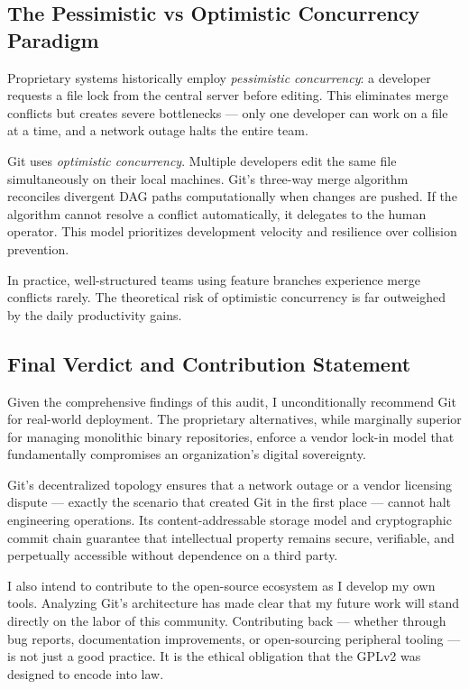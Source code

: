 \subsection{The Pessimistic vs Optimistic Concurrency Paradigm}

Proprietary systems historically employ \emph{pessimistic concurrency}: a developer
requests a file lock from the central server before editing. This eliminates merge
conflicts but creates severe bottlenecks — only one developer can work on a file at a
time, and a network outage halts the entire team.

Git uses \emph{optimistic concurrency}. Multiple developers edit the same file
simultaneously on their local machines. Git's three-way merge algorithm reconciles
divergent DAG paths computationally when changes are pushed. If the algorithm cannot
resolve a conflict automatically, it delegates to the human operator. This model
prioritizes development velocity and resilience over collision prevention.

In practice, well-structured teams using feature branches experience merge conflicts
rarely. The theoretical risk of optimistic concurrency is far outweighed by the daily
productivity gains.

\subsection{Final Verdict and Contribution Statement}

Given the comprehensive findings of this audit, I unconditionally recommend Git for
real-world deployment. The proprietary alternatives, while marginally superior for
managing monolithic binary repositories, enforce a vendor lock-in model that
fundamentally compromises an organization's digital sovereignty.

Git's decentralized topology ensures that a network outage or a vendor licensing
dispute — exactly the scenario that created Git in the first place — cannot halt
engineering operations. Its content-addressable storage model and cryptographic commit
chain guarantee that intellectual property remains secure, verifiable, and perpetually
accessible without dependence on a third party.

I also intend to contribute to the open-source ecosystem as I develop my own tools.
Analyzing Git's architecture has made clear that my future work will stand directly on
the labor of this community. Contributing back — whether through bug reports, documentation
improvements, or open-sourcing peripheral tooling — is not just a good practice.
It is the ethical obligation that the GPLv2 was designed to encode into law.
